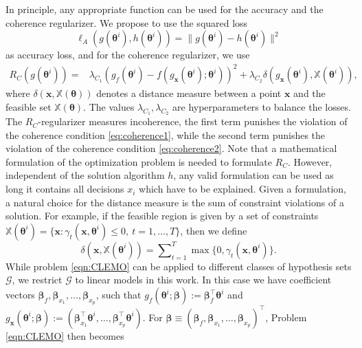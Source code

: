 \documentclass{article}
\theoremstyle{plain}
\theoremstyle{definition}
\theoremstyle{remark}
\begin{document}
In principle, any appropriate function can be used for the accuracy and the coherence regularizer. We propose to use the squared loss
\begin{equation}
\label{eqn:lA}
\ell_A(g(\bm{\theta}^i), h(\bm{\theta}^i)) = \|g(\bm{\theta}^i) - h(\bm{\theta}^i)\|^2
\end{equation}
as accuracy loss, and for the coherence regularizer, we use
\begin{equation}
\label{eqn:RC}
\begin{array}{ll}
R_C(g(\bm{\theta}^i)) = & \lambda_{C_1}(g_{f}(\bm{\theta}^i) - f(g_{\bm x}(\bm{\theta}^i); \bm{\theta}^i))^2  + \lambda_{C_2}\delta\left( g_{\bm x}(\bm{\theta}^i), \mathbb X(\bm{\theta}^i) \right),
\end{array}
\end{equation}
where $\delta(\bm{x},\mathbb X(\bm{\theta}))$ denotes a distance measure between a point $\bm{x}$ and the feasible set $\mathbb X(\bm{\theta})$. The values $\lambda_{C_1}, \lambda_{C_2}$ are hyperparameters to balance the losses. The $R_C$-regularizer measures incoherence, the first term punishes the violation of the coherence condition \eqref{eq:coherence1}, while the second term punishes the violation of the coherence condition \eqref{eq:coherence2}. Note that a mathematical formulation of the optimization problem is needed to formulate $R_C$. However, independent of the solution algorithm $h$, any valid formulation can be used as long it contains all decisions $x_i$ which have to be explained. Given a formulation, a natural choice for the distance measure is the sum of constraint violations of a solution. For example, if the feasible region is given by a set of constraints $\mathbb X(\bm{\theta}^i)=\{ \bm{x}: \gamma_t(\bm{x},\bm{\theta}^i) \le 0, \ t=1,\ldots ,T\}$, then we define 
\begin{equation}\label{eq:delta_constraints_slacks}
\delta\left(\bm{x},\mathbb X(\bm{\theta}^i)\right) = \sum\nolimits_{t=1}^{T} \max\{ 0, \gamma_t(\bm{x},\bm{\theta}^i)\}.
\end{equation}
While problem \eqref{eqn:CLEMO} can be applied to different classes of hypothesis sets $\mathcal G$, we restrict $\mathcal{G}$ to linear models in this work. In this case we have coefficient vectors $\bm{\beta}_f, \bm{\beta}_{x_1}, \dots, \bm{\beta}_{x_p}$, such that
$g_f(\bm{\theta}^i; \bm{\beta}) := \bm{\beta}_f^\intercal \bm{\theta}^i$ and $g_{\bm x}(\bm{\theta}^i; \bm{\beta}):=(\bm{\beta}_{x_1}^\intercal\bm{\theta}^i, \dots, \bm{\beta}_{x_p}^\intercal\bm{\theta}^i)$.
For $\bm{\beta} \equiv (\bm{\beta}_f, \bm{\beta}_{x_1}, \dots, \bm{\beta}_{x_p})^\intercal$, Problem \eqref{eqn:CLEMO} then becomes
\end{document}
